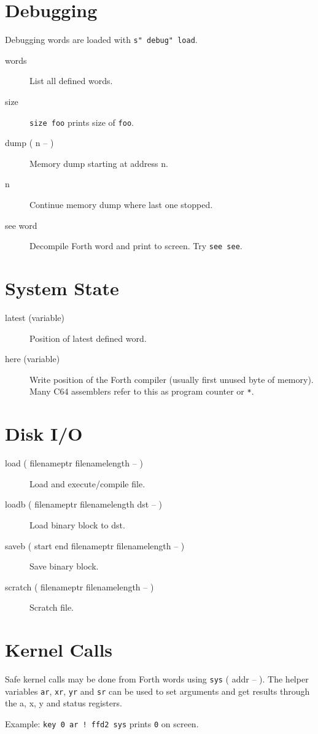 \section{Debugging}

Debugging words are loaded with \texttt{s" debug" load}.

\begin{description}
\item[words] List all defined words.
\item[size] \texttt{size foo} prints size of \texttt{foo}.
\item[dump ( n -- )] Memory dump starting at address n.
\item[n] Continue memory dump where last one stopped.
\item[see word] Decompile Forth word and print to screen. Try \texttt{see see}.
\end{description}

\section{System State}

\begin{description}

\item[latest (variable)] Position of latest defined word.

\item[here (variable)] Write position of the Forth compiler (usually first unused byte of memory). Many C64 assemblers refer to this as program counter or \texttt{*}.


\end{description}


\section{Disk I/O}

\begin{description}
\item[load ( filenameptr filenamelength -- )] Load and execute/compile file.
\item[loadb ( filenameptr filenamelength dst -- )] Load binary block to dst.
\item[saveb ( start end filenameptr filenamelength -- )] Save binary block.
\item[scratch ( filenameptr filenamelength -- )] Scratch file.
\end{description}

\section{Kernel Calls}

Safe kernel calls may be done from Forth words using \texttt{sys} ( addr -- ). The helper variables \texttt{ar}, \texttt{xr}, \texttt{yr} and \texttt{sr} can be used to set arguments and get results through the a, x, y and status registers.

Example: \texttt{key 0 ar ! ffd2 sys} prints \texttt{0} on screen.
